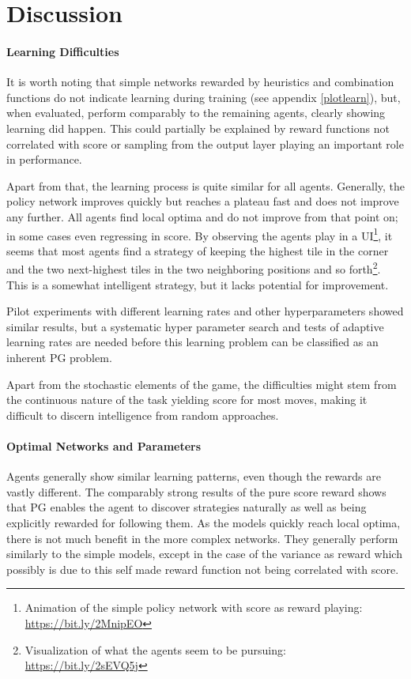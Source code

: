 \documentclass[11pt, fleqn]{article}
\begin{document}
\section{Discussion}
\paragraph*{Learning Difficulties}
It is worth noting that simple networks rewarded by heuristics and combination functions do not indicate learning during training (see appendix \ref{plotlearn}), but, when evaluated, perform comparably to the remaining agents, clearly showing learning did happen. This could partially be explained by reward functions not correlated with score or sampling from the output layer playing an important role in performance.

Apart from that, the learning process is quite similar for all agents. Generally, the policy network improves quickly but reaches a plateau fast and does not improve any further. All agents find local optima and do not improve from that point on; in some cases even regressing in score. By observing the agents play in a UI\footnote{Animation of the simple policy network with score as reward playing: \url{https://bit.ly/2MnipEO}}, it seems that most agents find a strategy of keeping the highest tile in the corner and the two next-highest tiles in the two neighboring positions and so forth\footnote{Visualization of what the agents seem to be pursuing: \url{https://bit.ly/2sEVQ5j}}. This is a somewhat intelligent strategy, but it lacks potential for improvement.
 
Pilot experiments with different learning rates and other hyperparameters showed similar results, but a systematic hyper parameter search and tests of adaptive learning rates are needed before this learning problem can be classified as an inherent PG problem.

Apart from the stochastic elements of the game, the difficulties might stem from the continuous nature of the task yielding score for most moves, making it difficult to discern intelligence from random approaches.
\paragraph*{Optimal Networks and Parameters}
Agents generally show similar learning patterns, even though the rewards are vastly different. The comparably strong results of the pure score reward shows that PG enables the agent to discover strategies naturally as well as being explicitly rewarded for following them. As the models quickly reach local optima, there is not much benefit in the more complex networks. They generally perform similarly to the simple models, except in the case of the variance as reward which possibly is due to this self made reward function not being correlated with score.
\end{document}
